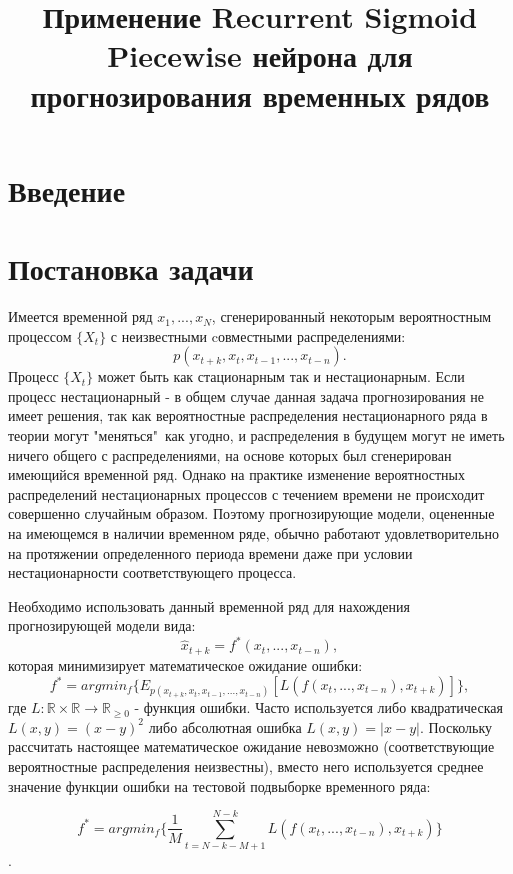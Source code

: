 \documentclass[11pt]{article}
\title{\textbf{Применение Recurrent Sigmoid Piecewise нейрона для прогнозирования временных рядов}}
\date{}
\begin{document}
\maketitle
\thispagestyle{empty}

\section*{Введение}
\section*{Постановка задачи}

Имеется временной ряд ${x_1, ..., x_N}$, сгенерированный некоторым вероятностным процессом $ \{X_t\} $ с неизвестными cовместными распределениями:
$$ p(x_{t+k}, x_{t}, x_{t-1}, ..., x_{t-n}). $$
Процесс $ \{X_t\} $ может быть как стационарным так и нестационарным. Если процесс нестационарный - в общем случае данная задача прогнозирования не имеет решения, так как вероятностные распределения нестационарного ряда в теории могут "меняться"\ как угодно, и распределения в будущем могут не иметь ничего общего с распределениями, на основе которых был сгенерирован имеющийся временной ряд. Однако на практике изменение вероятностных распределений нестационарных процессов с течением времени не происходит совершенно случайным образом. Поэтому прогнозирующие модели, оцененные на имеющемся в наличии временном ряде, обычно работают удовлетворительно на протяжении определенного периода времени даже при условии нестационарности соответствующего процесса.

Необходимо использовать данный временной ряд для нахождения прогнозирующей модели вида:
$$ \hat{x}_{t+k} = f^*(x_{t}, ..., x_{t-n}), $$
которая минимизирует математическое ожидание ошибки:
$$ f^* = argmin_f \{ E_{p(x_{t+k}, x_{t}, x_{t-1}, ..., x_{t-n})} [ L(f(x_{t}, ..., x_{t-n}), x_{t+k}) ] \}, $$
где $L: \mathbb{R} \times \mathbb{R} \to \mathbb{R}_{\geq 0} $ - функция ошибки. Часто используется либо квадратическая $ L(x, y) = (x-y)^2 $ либо абсолютная ошибка $ L(x, y) = |x-y| $. Поскольку рассчитать настоящее математическое ожидание невозможно (соответствующие вероятностные распределения неизвестны), вместо него используется среднее значение функции ошибки на тестовой подвыборке временного ряда:

$$ f^* = argmin_f \{ \frac{1}{M} \sum_{t=N-k-M+1}^{N - k}{L(f(x_t, ..., x_{t-n}), x_{t+k})} \} $$.
\end{document}

